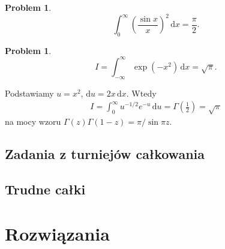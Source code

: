 \documentclass[9pt, twoside, a5paper, fleqn]{extbook}
\newcounter{counter}
\newtheorem{problemaux}[counter]{Problem}
\newenvironment{problem}{\begin{problemaux}}{\end{problemaux}}
\theoremstyle{remark}
\begin{document}
\begin{problem}
    \begin{equation}
        \int_0^\infty \left(\frac {\sin x}{x}\right)^2 \,\mathrm{d} x = \frac \pi 2.
    \end{equation}
\end{problem}

\begin{problem}
    \begin{equation}
        I = \int_{-\infty}^\infty \exp \left( -x^2 \right) \,\mathrm{d} x = \sqrt{\pi}.
    \end{equation}
\end{problem}

Podstawiamy $u = x^2$, $\mathrm{d} u = 2x \,\mathrm{d}x$.
Wtedy
\begin{align}
	I = \int_0^\infty u^{-1/2} e^{-u}\,\mathrm{d}u = \Gamma \left(\frac 12\right) = \sqrt{\pi}
\end{align}
na mocy wzoru $\Gamma (z) \Gamma(1-z) = \pi/\sin \pi z$.


	

\section{Zadania z turniejów całkowania}
	



\section{Trudne całki}
	
	
	

\chapter{Rozwiązania}
% 

% 
% 
% 

\end{document}
